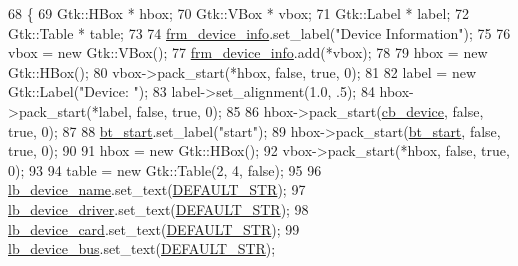 \begin{DoxyCode}
68                                                 \{
69         Gtk::HBox * hbox;
70         Gtk::VBox * vbox;
71         Gtk::Label * label;
72         Gtk::Table * table;
73 
74         \hyperlink{class_v_s_s_s___g_u_i_1_1_v4_l_interface_acc87fe0a73e532e097a6fba14668950a}{frm\_device\_info}.set\_label(\textcolor{stringliteral}{"Device Information"});
75 
76         vbox = \textcolor{keyword}{new} Gtk::VBox();
77         \hyperlink{class_v_s_s_s___g_u_i_1_1_v4_l_interface_acc87fe0a73e532e097a6fba14668950a}{frm\_device\_info}.add(*vbox);
78 
79         hbox = \textcolor{keyword}{new} Gtk::HBox();
80         vbox->pack\_start(*hbox, \textcolor{keyword}{false}, \textcolor{keyword}{true}, 0);
81 
82         label = \textcolor{keyword}{new} Gtk::Label(\textcolor{stringliteral}{"Device: "});
83         label->set\_alignment(1.0, .5);
84         hbox->pack\_start(*label, \textcolor{keyword}{false}, \textcolor{keyword}{true}, 0);
85 
86         hbox->pack\_start(\hyperlink{class_v_s_s_s___g_u_i_1_1_v4_l_interface_a9aebd92fe12b9b5acc25b1113dbd022e}{cb\_device}, \textcolor{keyword}{false}, \textcolor{keyword}{true}, 0);
87 
88         \hyperlink{class_v_s_s_s___g_u_i_1_1_v4_l_interface_a95958ffffbfb95a6a0fdefb2ffa6d3b9}{bt\_start}.set\_label(\textcolor{stringliteral}{"start"});
89         hbox->pack\_start(\hyperlink{class_v_s_s_s___g_u_i_1_1_v4_l_interface_a95958ffffbfb95a6a0fdefb2ffa6d3b9}{bt\_start}, \textcolor{keyword}{false}, \textcolor{keyword}{true}, 0);
90 
91         hbox = \textcolor{keyword}{new} Gtk::HBox();
92         vbox->pack\_start(*hbox, \textcolor{keyword}{false}, \textcolor{keyword}{true}, 0);
93 
94         table = \textcolor{keyword}{new} Gtk::Table(2, 4, \textcolor{keyword}{false});
95 
96         \hyperlink{class_v_s_s_s___g_u_i_1_1_v4_l_interface_a0001884d9b8cfde31da71445c1604c8a}{lb\_device\_name}.set\_text(\hyperlink{v4linterface_8cpp_ad148eb63667d249bea3af0477374fa53}{DEFAULT\_STR});
97         \hyperlink{class_v_s_s_s___g_u_i_1_1_v4_l_interface_a7fe7bf3327c1f25e1c3b44f53e5c5a8f}{lb\_device\_driver}.set\_text(\hyperlink{v4linterface_8cpp_ad148eb63667d249bea3af0477374fa53}{DEFAULT\_STR});
98         \hyperlink{class_v_s_s_s___g_u_i_1_1_v4_l_interface_add0fb393e547f0ccaa23d6b29025efe4}{lb\_device\_card}.set\_text(\hyperlink{v4linterface_8cpp_ad148eb63667d249bea3af0477374fa53}{DEFAULT\_STR});
99         \hyperlink{class_v_s_s_s___g_u_i_1_1_v4_l_interface_a14d315a5613f2a10e2534c9090ca74c0}{lb\_device\_bus}.set\_text(\hyperlink{v4linterface_8cpp_ad148eb63667d249bea3af0477374fa53}{DEFAULT\_STR});

\end{DoxyCode}
